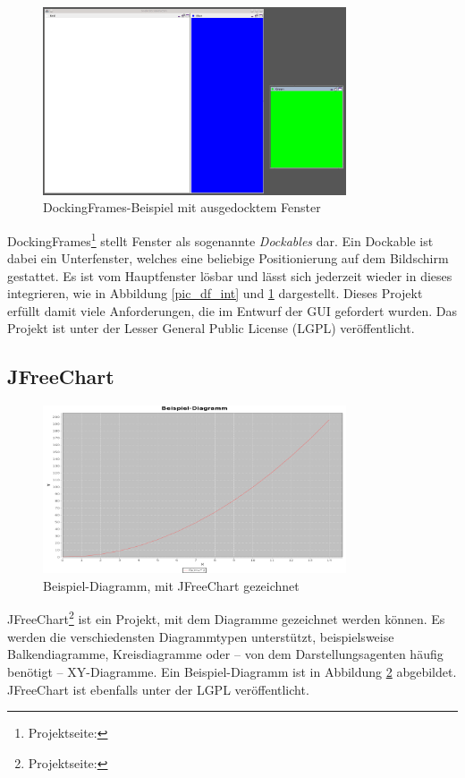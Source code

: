 \documentclass[a4paper,12pt,oneside,openright,onecolumn,final,titlepage,fleqn,ngerman]{scrreprt}
\newcommand{\repag}{Darstellungsagent}
\begin{document}
	\begin{figure}[ht]
		\centering
		\includegraphics[keepaspectratio=true,width=0.8\textwidth]{res/DF_ext.png}
		\caption{DockingFrames-Beispiel mit ausgedocktem Fenster}
		\label{pic_df_ext}
	\end{figure}
	DockingFrames\footnote{Projektseite: } stellt Fenster als sogenannte \emph{Dockables} dar. Ein Dockable ist dabei ein Unterfenster, welches eine beliebige Positionierung auf dem Bildschirm gestattet. Es ist vom Hauptfenster lösbar und lässt sich jederzeit wieder in dieses integrieren, wie in Abbildung \ref{pic_df_int} und \ref{pic_df_ext} dargestellt. Dieses Projekt erfüllt damit viele Anforderungen, die im Entwurf der GUI gefordert wurden. Das Projekt ist unter der  Lesser General Public License (LGPL) veröffentlicht.
	
	\subsection{JFreeChart}\label{kap_JFreeChart}
	\begin{figure}[ht]
		\centering
		\includegraphics[keepaspectratio=true,width=0.8\textwidth]{res/jfc_bsp.png}
		\caption{Beispiel-Diagramm, mit JFreeChart gezeichnet}
		\label{pic_jfc_bsp}
	\end{figure}
	JFreeChart\footnote{Projektseite: } ist ein Projekt, mit dem Diagramme gezeichnet werden können. Es werden die verschiedensten Diagrammtypen unterstützt, beispielsweise Balkendiagramme, Kreisdiagramme oder -- von dem \repag{}en häufig benötigt -- XY-Diagramme. Ein Beispiel-Diagramm ist in Abbildung \ref{pic_jfc_bsp} abgebildet. JFree\-Chart ist ebenfalls unter der LGPL veröffentlicht.
	
\end{document}
